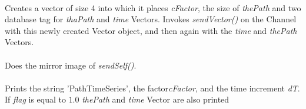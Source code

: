 \\
Creates a vector of size 4 into which it places {\em cFactor}, the
size of {\em thePath} and two  database tag for {\em 
thaPath} and {\em time} Vectors.  Invokes {\em sendVector()} on the
Channel with this newly created Vector object, and then again with the
{\em time} and {\em thePath} Vectors.\\

\\
Does the mirror image of {\em sendSelf()}. \\

\\
Prints the string 'PathTimeSeries', the factor{\em cFactor}, and the time
increment {\em dT}. If {\em flag} is equal to $1.0$ {\em
thePath} and {\em time} Vector are also printed\\